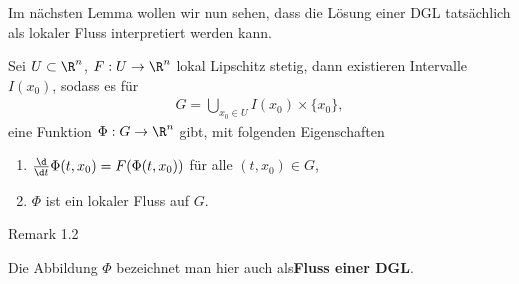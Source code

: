 \documentclass[letterpaper,10pt,english]{jupyterBook}
\begin{document}
Im nächsten Lemma wollen wir nun sehen, dass die Lösung einer DGL tatsächlich als lokaler Fluss interpretiert werden kann.
\label{ode/fluesse:lemma-3}
\begin{lemma}{}{}



Sei \(U\subset\R^n\), \(F:U \rightarrow \R^n\) lokal Lipschitz stetig, dann existieren Intervalle \(I(x_0)\), sodass es für
\begin{align*}
G = \bigcup_{x_0\in U} I(x_0)\times\{x_0\},
\end{align*}
eine Funktion \(\Phi:G\rightarrow \R^n\) gibt, mit folgenden Eigenschaften
\begin{enumerate}

\item {} 
\(\frac{\d}{\d t} \Phi(t, x_0) = F(\Phi(t, x_0))\) für alle \((t,x_0)\in G\),

\item {} 
\(\Phi\) ist ein lokaler Fluss auf \(G\).

\end{enumerate}
\end{lemma}
\label{ode/fluesse:remark-4}
\begin{emphBox}{}{}{Remark 1.2}



Die Abbildung \(\Phi\) bezeichnet man hier auch als\textbf{Fluss einer DGL}.
\end{emphBox}
\end{document}
